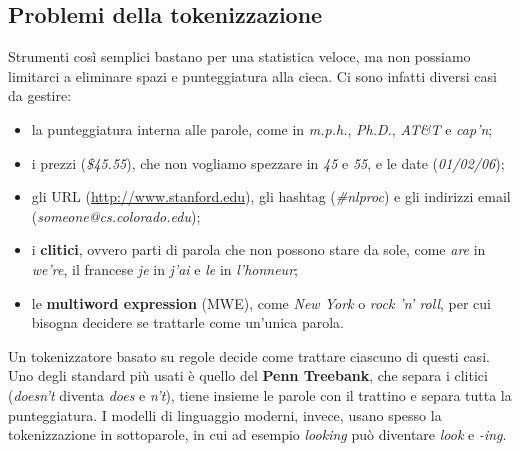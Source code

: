 \subsection{Problemi della tokenizzazione}
Strumenti così semplici bastano per una statistica veloce, ma non possiamo limitarci a eliminare spazi e punteggiatura alla cieca. Ci sono infatti diversi casi da gestire:
\begin{itemize}
    \item la punteggiatura interna alle parole, come in \textit{m.p.h.}, \textit{Ph.D.}, \textit{AT\&T} e \textit{cap'n};
    \item i prezzi (\textit{\$45.55}), che non vogliamo spezzare in \textit{45} e \textit{55}, e le date (\textit{01/02/06});
    \item gli URL (\url{http://www.stanford.edu}), gli hashtag (\textit{\#nlproc}) e gli indirizzi email (\textit{someone@cs.colorado.edu});
    \item i \textbf{clitici}, ovvero parti di parola che non possono stare da sole, come \textit{are} in \textit{we're}, il francese \textit{je} in \textit{j'ai} e \textit{le} in \textit{l'honneur};
    \item le \textbf{multiword expression} (MWE), come \textit{New York} o \textit{rock 'n' roll}, per cui bisogna decidere se trattarle come un'unica parola.
\end{itemize}
Un tokenizzatore basato su regole decide come trattare ciascuno di questi casi. Uno degli standard più usati è quello del \textbf{Penn Treebank}, che separa i clitici (\textit{doesn't} diventa \textit{does} e \textit{n't}), tiene insieme le parole con il trattino e separa tutta la punteggiatura. I modelli di linguaggio moderni, invece, usano spesso la tokenizzazione in sottoparole, in cui ad esempio \textit{looking} può diventare \textit{look} e \textit{-ing}.

